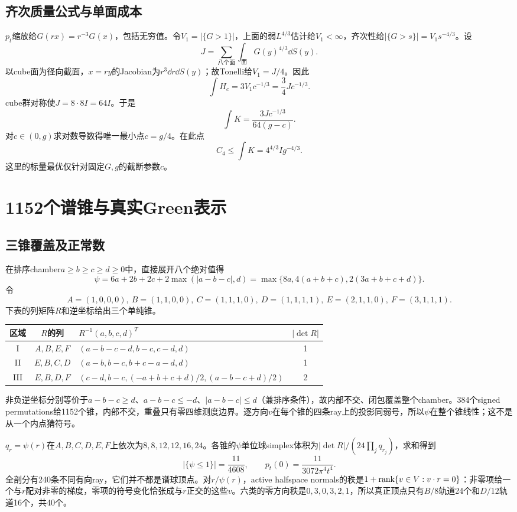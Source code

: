 \documentclass[UTF8,11pt,a4paper,fontset=fandol]{ctexart}
\theoremstyle{remark}\newtheorem{remark}[theorem]{注}
\newcommand{\1}{\mathbf1}\newcommand{\pos}[1]{(#1)_+}
\begin{document}
\subsection{齐次质量公式与单面成本}
$p_t$缩放给$G(rx)=r^{-3}G(x)$，包括无穷值。令$V_1=|\{G>1\}|$，上面的弱$L^{4/3}$估计给$V_1<\infty$，齐次性给$|\{G>s\}|=V_1s^{-4/3}$。设
\[
 J=\sum_{\text{八个面}}\int_{\text{面}}G(y)^{4/3}\dd S(y).
\]
以cube面为径向截面，$x=ry$的Jacobian为$r^3\dd r\dd S(y)$；故Tonelli给$V_1=J/4$。因此
\begin{equation}\label{eq:mass}
 \int H_c=3V_1c^{-1/3}=\frac34Jc^{-1/3}.
\end{equation}
cube群对称使$J=8\cdot8 I=64I$。于是
\[
 \int K=\frac{3Jc^{-1/3}}{64(g-c)}.
\]
对$c\in(0,g)$求对数导数得唯一最小点$c=g/4$。在此点
\begin{equation}\label{eq:massbound}
 C_4\le\int K=4^{4/3}Ig^{-4/3}.
\end{equation}
这里的标量最优仅针对固定$G,g$的截断参数$c$。

\section{1152个谱锥与真实Green表示}
\subsection{三锥覆盖及正常数}
在排序chamber$a\ge b\ge c\ge d\ge0$中，直接展开八个绝对值得
\[
 \psi=6a+2b+2c+2\max(|a-b-c|,d)
 =\max\{8a,4(a+b+c),2(3a+b+c+d)\}.
\]
令
\[
 A=(1,0,0,0),\ B=(1,1,0,0),\ C=(1,1,1,0),\ D=(1,1,1,1),
 \ E=(2,1,1,0),\ F=(3,1,1,1).
\]
下表的列矩阵$R$和逆坐标给出三个单纯锥。
\begin{center}\small
\begin{tabular}{cclc}\toprule
区域&$R$的列&$R^{-1}(a,b,c,d)^T$&$|\det R|$\\\midrule
I&$A,B,E,F$&$(a-b-c-d,b-c,c-d,d)$&1\\
II&$E,B,C,D$&$(a-b,b-c,b+c-a-d,d)$&1\\
III&$E,B,D,F$&$(c-d,b-c,(-a+b+c+d)/2,(a-b-c+d)/2)$&2\\\bottomrule
\end{tabular}
\end{center}
非负逆坐标分别等价于$a-b-c\ge d$、$a-b-c\le-d$、$|a-b-c|\le d$（兼排序条件），故内部不交、闭包覆盖整个chamber。384个signed permutations给1152个锥，内部不交，重叠只有零四维测度边界。逐方向$v$在每个锥的四条ray上的投影同弱号，所以$\psi$在整个锥线性；这不是从一个内点猜符号。

$q_r=\psi(r)$在$A,B,C,D,E,F$上依次为$8,8,12,12,16,24$。各锥的$\psi$单位球simplex体积为$|\det R|/(24\prod_jq_{r_j})$，求和得到
\begin{equation}\label{eq:peak}
 |\{\psi\le1\}|=\frac{11}{4608},\qquad p_t(0)=\frac{11}{3072\pi^4t^4}.
\end{equation}
全剖分有240条不同有向ray，它们并不都是谱球顶点。对$r/\psi(r)$，active halfspace normals的秩是$1+\operatorname{rank}\{v\in V:v\cdot r=0\}$：非零项给一个与$r$配对非零的梯度，零项的符号变化恰张成与$r$正交的这些$v$。六类的零方向秩是$0,3,0,3,2,1$，所以真正顶点只有$B/8$轨道24个和$D/12$轨道16个，共40个。
\end{document}
